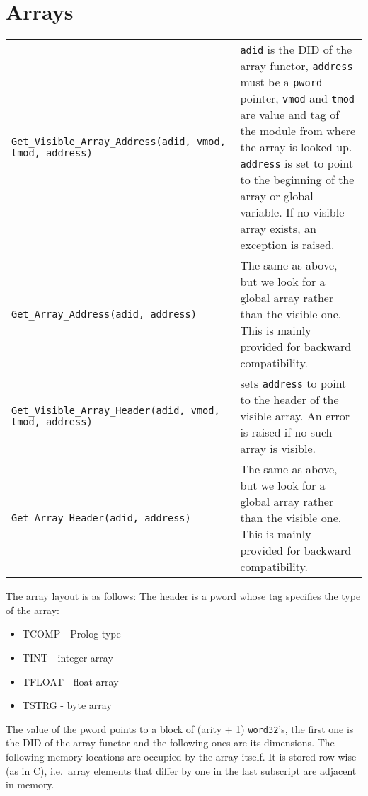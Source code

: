 \section{Arrays}
\begin{tabular}{|p{7.3cm}p{7.9cm}|}
\hline
{\tt \mbox{Get_Visible_Array_Address(adid, vmod,} tmod, address)} &
{\tt adid} is the DID of the array functor, {\tt address} must be
a {\tt pword} pointer, {\tt vmod} and {\tt tmod} are value and tag
of the module from where the array is looked up.
{\tt address} is set to point to the
beginning of the array or global variable. If
no visible array exists, an exception is raised.\\

{\tt Get_Array_Address(adid, address)} &
The same as above, but we look for a global array rather than the visible one. 
This is mainly provided for backward compatibility.\\

{\tt \mbox{Get_Visible_Array_Header(adid, vmod, } tmod, address)} & 
sets {\tt address} to point to the header of the visible array.
An error is raised if no such array is visible.\\
{\tt Get_Array_Header(adid, address)} & 
The same as above, but we look for a global array rather than the visible one. 
This is mainly provided for backward compatibility.\\
\hline
\end{tabular}

\vspace*{0.3cm}

The array layout is as follows:
The header is a pword whose tag specifies the type of the array:
\begin{itemize}
\item TCOMP - Prolog type

\item TINT - integer array

\item TFLOAT - float array

\item TSTRG - byte array
\end{itemize}
The value of the pword points to a block of (arity + 1) {\tt word32}'s,
the first one is the DID of the array functor
and the following ones are its dimensions.
The following memory locations are occupied by the array itself.
It is stored row-wise (as in C), i.e.\ array elements that differ by
one in the last subscript are adjacent in memory.

